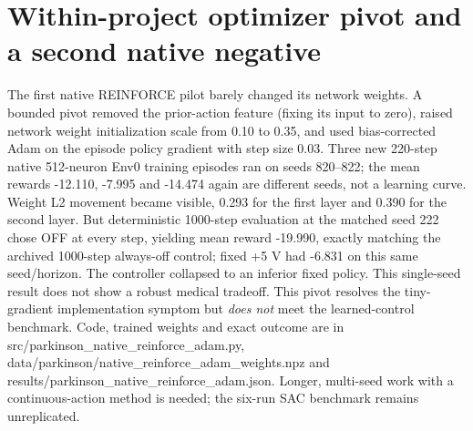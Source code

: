 \section{Within-project optimizer pivot and a second native negative}
The first native REINFORCE pilot barely changed its network weights. A bounded pivot removed the prior-action feature (fixing its input to zero), raised network weight initialization scale from 0.10 to 0.35, and used bias-corrected Adam on the episode policy gradient with step size 0.03. Three new 220-step native 512-neuron Env0 training episodes ran on seeds 820--822; the mean rewards -12.110, -7.995 and -14.474 again are different seeds, not a learning curve. Weight L2 movement became visible, 0.293 for the first layer and 0.390 for the second layer. But deterministic 1000-step evaluation at the matched seed 222 chose OFF at every step, yielding mean reward -19.990, exactly matching the archived 1000-step always-off control; fixed +5 V had -6.831 on this same seed/horizon. The controller collapsed to an inferior fixed policy. This single-seed result does not show a robust medical tradeoff. This pivot resolves the tiny-gradient implementation symptom but \emph{does not} meet the learned-control benchmark. Code, trained weights and exact outcome are in src/parkinson\_native\_reinforce\_adam.py, data/parkinson/native\_reinforce\_adam\_weights.npz and results/parkinson\_native\_reinforce\_adam.json. Longer, multi-seed work with a continuous-action method is needed; the six-run SAC benchmark remains unreplicated.

